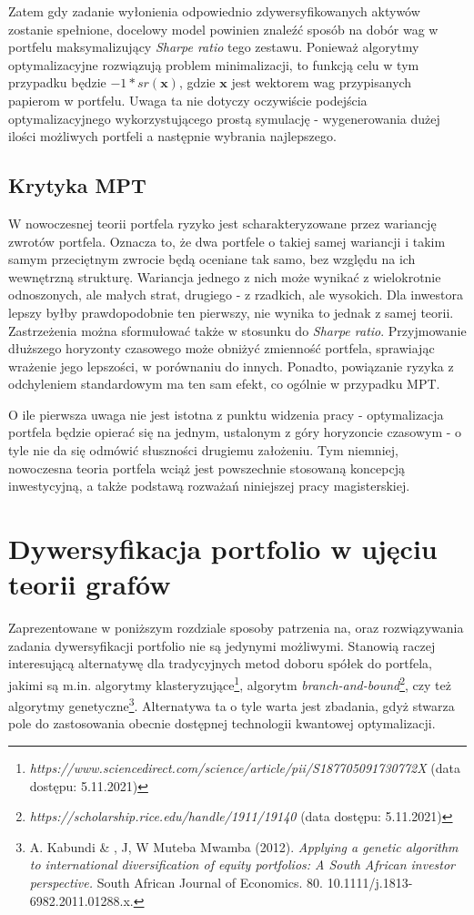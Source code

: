 \documentclass[12pt,a4paper,twoside,openany]{book}
\begin{document}
Zatem gdy zadanie wyłonienia odpowiednio zdywersyfikowanych aktywów zostanie spełnione, docelowy model powinien znaleźć sposób na dobór wag w portfelu maksymalizujący \textit{Sharpe ratio} tego zestawu. 
Ponieważ algorytmy optymalizacyjne rozwiązują problem minimalizacji, to funkcją celu w tym przypadku będzie $-1 * sr(\textbf{x})$, gdzie $\textbf{x}$ jest wektorem wag przypisanych papierom w portfelu.
Uwaga ta nie dotyczy oczywiście podejścia optymalizacyjnego wykorzystującego prostą symulację - wygenerowania dużej ilości możliwych portfeli a następnie wybrania najlepszego.

\section{Krytyka MPT}
W nowoczesnej teorii portfela ryzyko jest scharakteryzowane przez wariancję zwrotów portfela. 
Oznacza to, że dwa portfele o takiej samej wariancji i takim samym przeciętnym zwrocie będą oceniane tak samo, bez względu na ich wewnętrzną strukturę.
Wariancja jednego z nich może wynikać z wielokrotnie odnoszonych, ale małych strat, drugiego - z rzadkich, ale wysokich.
Dla inwestora lepszy byłby prawdopodobnie ten pierwszy, nie wynika to jednak z samej teorii.
Zastrzeżenia można sformułować także w stosunku do \textit{Sharpe ratio}.
Przyjmowanie dłuższego horyzonty czasowego może obniżyć zmienność portfela, sprawiając wrażenie jego lepszości, w porównaniu do innych.
Ponadto, powiązanie ryzyka z odchyleniem standardowym ma ten sam efekt, co ogólnie w przypadku MPT.

O ile pierwsza uwaga nie jest istotna z punktu widzenia pracy - optymalizacja portfela będzie opierać się na jednym, ustalonym z góry horyzoncie czasowym - o tyle nie da się odmówić słuszności drugiemu założeniu.
Tym niemniej, nowoczesna teoria portfela wciąż jest powszechnie stosowaną koncepcją inwestycyjną, a także podstawą rozważań niniejszej pracy magisterskiej.


\chapter{Dywersyfikacja portfolio w ujęciu teorii grafów}
Zaprezentowane w poniższym rozdziale sposoby patrzenia na, oraz rozwiązywania zadania dywersyfikacji portfolio nie są jedynymi możliwymi. Stanowią raczej interesującą alternatywę dla tradycyjnych metod doboru spółek do portfela, jakimi są m.in. algorytmy klasteryzujące\footnote{\textit{https://www.sciencedirect.com/science/article/pii/S187705091730772X} (data dostępu: 5.11.2021)}, algorytm \textit{branch-and-bound}\footnote{\textit{https://scholarship.rice.edu/handle/1911/19140} (data dostępu: 5.11.2021)}, czy też algorytmy genetyczne\footnote{A. Kabundi \& , J, W Muteba Mwamba (2012). \textit{Applying a genetic algorithm to international diversification of equity portfolios: A South African investor perspective.} South African Journal of Economics. 80. 10.1111/j.1813-6982.2011.01288.x.}. 
Alternatywa ta o tyle warta jest zbadania, gdyż stwarza pole do zastosowania obecnie dostępnej technologii kwantowej optymalizacji. 
\end{document}
